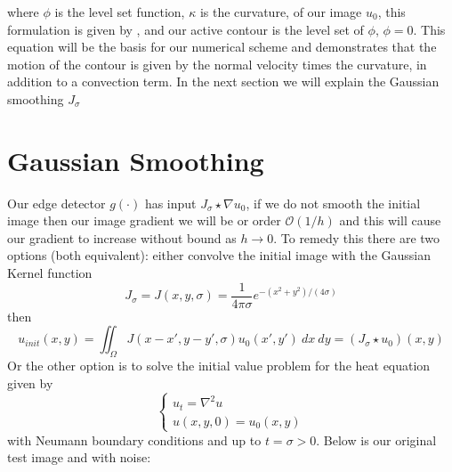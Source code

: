 \documentclass[margin=1in,12pt,3p]{elsarticle}
\begin{document}
where $\phi$ is the level set function, $\kappa$ is the curvature, of our image $u_0$, this formulation is given by \cite{osti_478429}, and our active contour is the level set of $\phi$, ${\phi=0}$. This equation will be the basis for our numerical scheme and demonstrates that the motion of the contour is given by the normal velocity times the curvature, in addition to a convection term. In the next section we will explain the Gaussian smoothing $J_\sigma$
\section{Gaussian Smoothing}
Our edge detector $g(\cdot)$ has input $J_\sigma\star \nabla u_0$, if we do not smooth the initial image then our image gradient we will be or order $\mathcal{O}(1/h)$ and this will cause our gradient to increase without bound as $h\rightarrow 0$. To remedy this there are two options (both equivalent): either convolve the initial image with the Gaussian Kernel function \cite{osher2006level}
\[
J_\sigma=J(x,y,\sigma)=\frac{1}{4\pi\sigma}e^{-(x^2+y^2)/(4\sigma)}
\]
then
\[
u_{init}(x,y)=\iint_\Omega J(x-x',y-y',\sigma)u_0(x',y')\ dx\ dy = (J_\sigma\star u_0)(x,y)
\]
Or the other option is to solve the initial value problem for the heat equation \cite{osher2006level} given by
\[
\begin{cases}
u_t = \nabla^2 u\\
u(x,y,0)=u_0(x,y)
\end{cases}
\]
with Neumann boundary conditions and up to $t=\sigma>0$. Below is our original test image and with noise:
\end{document}
